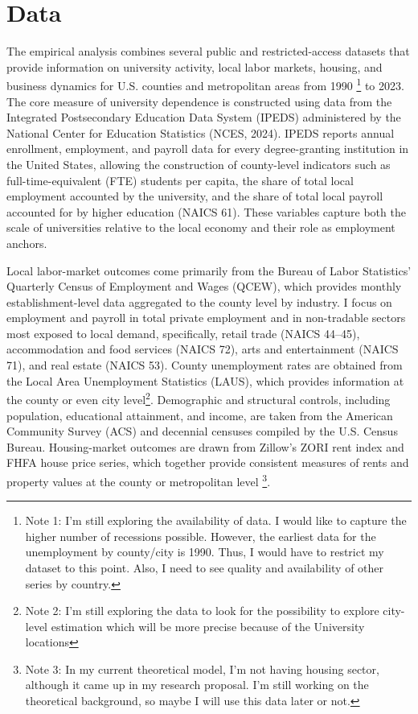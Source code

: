 
\newpage
\section{ Data}

\noindent The empirical analysis combines several public and restricted-access datasets that provide information on university activity, local labor markets, housing, and business dynamics for U.S. counties and metropolitan areas from 1990 \footnote{Note 1: I'm still exploring the availability of data. I would like to capture the higher number of recessions possible. However, the earliest data for the unemployment by county/city is 1990. Thus, I would have to restrict my dataset to this point. Also, I need to see quality and availability of other series by country.} to 2023. The core measure of university dependence is constructed using data from the Integrated Postsecondary Education Data System (IPEDS) administered by the National Center for Education Statistics (NCES, 2024). IPEDS reports annual enrollment, employment, and payroll data for every degree-granting institution in the United States, allowing the construction of county-level indicators such as full-time-equivalent (FTE) students per capita, the share of total local employment accounted by the university, and the share of total local payroll accounted for by higher education (NAICS 61). These variables capture both the scale of universities relative to the local economy and their role as employment anchors.

\noindent Local labor-market outcomes come primarily from the Bureau of Labor Statistics’ Quarterly Census of Employment and Wages (QCEW), which provides monthly establishment-level data aggregated to the county level by industry. I focus on employment and payroll in total private employment and in non-tradable sectors most exposed to local demand, specifically, retail trade (NAICS 44–45), accommodation and food services (NAICS 72), arts and entertainment (NAICS 71), and real estate (NAICS 53). County unemployment rates are obtained from the Local Area Unemployment Statistics (LAUS), which provides information at the county or even city level\footnote{Note 2: I'm still exploring the data to look for the possibility to explore city-level estimation which will be more precise because of the University locations}. Demographic and structural controls, including population, educational attainment, and income, are taken from the American Community Survey (ACS) and decennial censuses compiled by the U.S. Census Bureau. Housing-market outcomes are drawn from Zillow’s ZORI rent index and FHFA house price series, which together provide consistent measures of rents and property values at the county or metropolitan level \footnote{Note 3: In my current theoretical model, I'm not having housing sector, although it came up in my research proposal. I'm still working on the theoretical background, so maybe I will use this data later or not.}.

